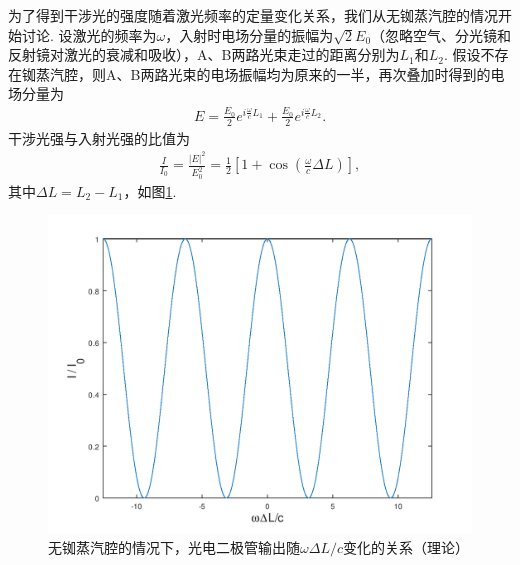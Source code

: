 \documentclass[a4paper, 10pt]{article}
\providecommand{\abs}[1]{\left\lvert#1\right\rvert} %
\begin{document}
\begin{multicols*}{2}
为了得到干涉光的强度随着激光频率的定量变化关系，我们从无铷蒸汽腔的情况开始讨论. 设激光的频率为$\omega$，入射时电场分量的振幅为$\sqrt{2}E_0$（忽略空气、分光镜和反射镜对激光的衰减和吸收），A、B两路光束走过的距离分别为$L_1$和$L_2$. 假设不存在铷蒸汽腔，则A、B两路光束的电场振幅均为原来的一半，再次叠加时得到的电场分量为
\begin{align}
    E=\frac{E_0}{2}e^{i\frac{\omega}{c}L_1}+\frac{E_0}{2}e^{i\frac{\omega}{c}L_2}.
\end{align}
干涉光强与入射光强的比值为
\begin{align}
    \label{I/I_0-without-cell}
    \frac{I}{I_0}=\frac{\abs{E}^2}{E_0^2}=\frac{1}{2}\left[1+\cos\left(\frac{\omega}{c}\Delta L\right)\right],
\end{align}
其中$\Delta L=L_2-L_1$，如图\ref{OutputWithoutRbCell}.
\begin{figure}[H]
    \centering
    \includegraphics[width=.9\columnwidth]{OutputWithoutCell.png}
    \caption{无铷蒸汽腔的情况下，光电二极管输出随$\omega\Delta L/c$变化的关系（理论）}
        \label{OutputWithoutRbCell}
\end{figure}


\end{multicols*}
\end{document}
